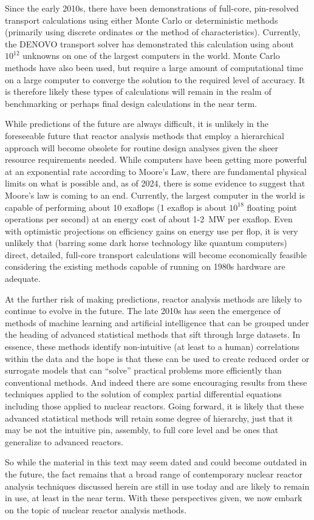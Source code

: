 Since the early 2010s, there have been demonstrations of full-core, pin-resolved transport calculations using either Monte Carlo or deterministic methods (primarily using discrete ordinates or the method of characteristics). Currently, the DENOVO transport solver has demonstrated this calculation using about $10^{12}$ unknowns on one of the largest computers in the world. Monte Carlo methods have also been used, but require a large amount of computational time on a large computer to converge the solution to the required level of accuracy. It is therefore likely these types of calculations will remain in the realm of benchmarking or perhaps final design calculations in the near term.

While predictions of the future are always difficult, it is unlikely in the foreseeable future that reactor analysis methods that employ a hierarchical approach will become obsolete for routine design analyses given the sheer resource requirements needed. While computers have been getting more powerful at an exponential rate according to Moore's Law, there are fundamental physical limits on what is possible and, as of 2024, there is some evidence to suggest that Moore's law is coming to an end. Currently, the largest computer in the world is capable of performing about 10 exaflops (1 exaflop is about $10^{18}$ floating point operations per second) at an energy cost of about 1-2~MW per exaflop. Even with optimistic projections on efficiency gains on energy use per flop, it is very unlikely that (barring some dark horse technology like quantum computers) direct, detailed, full-core transport calculations will become economically feasible considering the existing methods capable of running on 1980s hardware are adequate.

At the further risk of making predictions, reactor analysis methods are likely to continue to evolve in the future. The late 2010s has seen the emergence of methods of machine learning and artificial intelligence that can be grouped under the heading of advanced statistical methods that sift through large datasets. In essence, these methods identify non-intuitive (at least to a human) correlations within the data and the hope is that these can be used to create reduced order or surrogate models that can ``solve'' practical problems more efficiently than conventional methods. And indeed there are some encouraging results from these techniques applied to the solution of complex partial differential equations including those applied to nuclear reactors. Going forward, it is likely that these advanced statistical methods will retain some degree of hierarchy, just that it may be not the intuitive pin, assembly, to full core level and be ones that generalize to advanced reactors.

So while the material in this text may seem dated and could become outdated in the future, the fact remains that a broad range of contemporary nuclear reactor analysis techniques discussed herein are still in use today and are likely to remain in use, at least in the near term. With these perspectives given, we now embark on the topic of nuclear reactor analysis methods.
